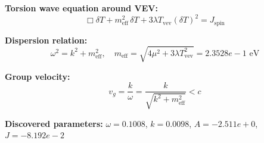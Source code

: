 
\textbf{Torsion wave equation around VEV:}
\begin{equation}
  \Box \delta T + m_{\text{eff}}^2 \, \delta T + 3\lambda T_{\text{vev}} (\delta T)^2 = J_{\text{spin}}
\end{equation}

\textbf{Dispersion relation:}
\begin{equation}
  \omega^2 = k^2 + m_{\text{eff}}^2, \quad
  m_{\text{eff}} = \sqrt{4\mu^2 + 3\lambda T_{\text{vev}}^2} = 2.3528e-1 \text{ eV}
\end{equation}

\textbf{Group velocity:}
\begin{equation}
  v_g = \frac{k}{\omega} = \frac{k}{\sqrt{k^2 + m_{\text{eff}}^2}} < c
\end{equation}

\textbf{Discovered parameters:}
$\omega = 0.1008$, \quad
$k = 0.0098$, \quad
$A = -2.511e+0$, \quad
$J = -8.192e-2$